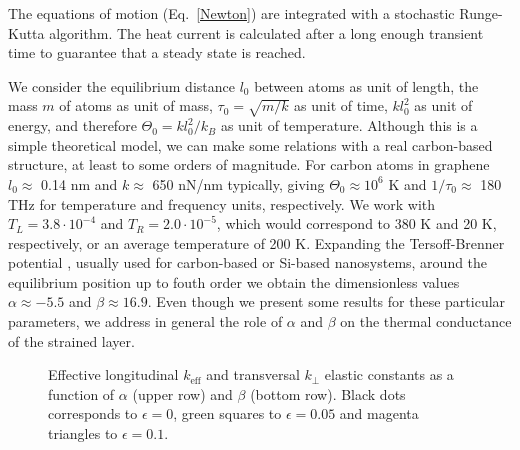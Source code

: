 \documentclass[12pt]{article}
\begin{document}
The equations of motion (Eq.~\ref{Newton}) are integrated with a stochastic Runge-Kutta algorithm. The heat current is calculated after a long enough transient time to guarantee that a steady state is reached.

We consider the equilibrium distance $l_0$ between atoms as unit of length, the mass $m$ of atoms as unit of mass, $\tau_0 = \sqrt{m/k}$ as unit of time, $k l_0^2$ as unit of energy, and therefore $\Theta_0 = k l_0^2/k_{B}$  as unit of temperature.
Although this is a simple theoretical model, we can make some relations with a real carbon-based structure, at least to some orders of magnitude.  For carbon atoms in graphene $l_0 \approx$ 0.14 nm and $k \approx$ 650 nN/nm typically, giving $\Theta_0 \approx 10^6$ K and $1/\tau_0 \approx$ 180 THz for temperature and frequency units, respectively.
We work with $T_{L}=3.8\cdot 10^{-4}$ and $T_{R}=2.0\cdot 10^{-5}$, which would correspond to 380 K and 20 K, respectively, or an average temperature of 200 K.
Expanding the Tersoff-Brenner potential \cite{Tersoff}, usually used for carbon-based or Si-based nanosystems, around the equilibrium position up to fouth order we obtain the dimensionless values $\alpha \approx -5.5$ and $\beta \approx 16.9$.
Even though we present some results for these particular parameters, we address in general the role of $\alpha$ and $\beta$ on the thermal conductance of the strained layer.


\begin{figure}[h]
\begin{minipage}{0.5\textwidth}
\end{minipage}%
\hfill
\begin{minipage}{0.5\textwidth}
\end{minipage}%
\vfill
\begin{minipage}{0.5\textwidth}
\end{minipage}%
\hfill
\begin{minipage}{0.5\textwidth}
\end{minipage}%
\vfill
\caption{Effective longitudinal $k_{\text{eff}}$ and transversal $k_{\perp}$ elastic constants as a function of $\alpha$ (upper row) and $\beta$ (bottom row). Black dots corresponds to $\epsilon=0$, green squares to $\epsilon=0.05$ and magenta triangles to $\epsilon=0.1$.}
\label{fig:keff}
\end{figure}
\end{document}
